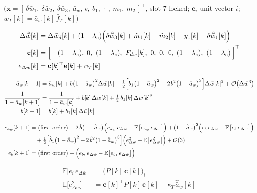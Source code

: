 \documentclass[11pt,a4paper,fontset=none]{ctexart}
\newcommand{\ba}{\bar{a}}
\newcommand{\bw}{\bar{w}}
\newcommand{\dW}{\Delta\bw}
\newcommand{\dWh}{\Delta\hat{\bw}}
\newcommand{\eD}{e_{\Delta\bw}}
\newcommand{\ah}{\hat{\ba}_w}
\newcommand{\bh}{\hat{b}}
\newcommand{\bhh}{\hat{b}_1}
\newcommand{\ea}{e_{\ba_w}}
\newcommand{\E}{\mathbb{E}}
\begin{document}
$\bigl(\mathbf{x} = [\,\delta\bw_1,\ \delta\bw_2,\ \delta\bw_3,\ \ba_w,\ b,\ b_1,\ \cdot\,,\ m_1,\ m_2\,]^{\top}$, slot 7 locked;
$\mathbf{e}_i$ unit vector $i$; $w_T[k] = \ba_w[k]\,\bar f_T[k]\bigr)$

\begin{align*}
\dWh[k] &= \Delta\bw_d[k] + (1-\lambda_c)\Bigl(\delta\hat{\bw}_3[k] + \hat m_1[k] + \hat m_2[k] + y_1[k] - \delta\hat{\bw}_1[k]\Bigr) \\
\mathbf{c}[k] &= \Bigl[\,-(1-\lambda_c),\ 0,\ (1-\lambda_c),\ F_{dw}[k],\ 0,\ 0,\ 0,\ (1-\lambda_c),\ (1-\lambda_c)\,\Bigr]^{\top} \\
\eD[k] &= \mathbf{c}[k]^{\top}\mathbf{e}[k] + w_T[k]
\end{align*}

\begin{align*}
\ba_w[k+1] &= \ba_w[k] + b\bigl(1-\ba_w\bigr)^{2}\dW[k] + \tfrac{1}{2}\Bigl[b_1\bigl(1-\ba_w\bigr)^{2} - 2\,b^{2}\bigl(1-\ba_w\bigr)^{3}\Bigr]\dW[k]^{2} + \mathcal{O}\bigl(\dW^{3}\bigr) \\
\frac{1}{1-\ba_w[k+1]} &= \frac{1}{1-\ba_w[k]} + b[k]\,\dW[k] + \tfrac{1}{2}\,b_1[k]\,\dW[k]^{2} \\
b[k+1] &= b[k] + b_1[k]\,\dW[k]
\end{align*}

\begin{align*}
\ea[k+1] &= \bigl(\text{first order}\bigr) - 2\,\bh\bigl(1-\ah\bigr)\Bigl(\ea\,\eD - \E\bigl[\ea\,\eD\bigr]\Bigr)
            + \bigl(1-\ah\bigr)^{2}\Bigl(e_b\,\eD - \E\bigl[e_b\,\eD\bigr]\Bigr) \\
         &\quad + \tfrac{1}{2}\Bigl[\bhh\bigl(1-\ah\bigr)^{2} - 2\,\bh^{2}\bigl(1-\ah\bigr)^{3}\Bigr]\Bigl(\eD^{2} - \E\bigl[\eD^{2}\bigr]\Bigr) + \mathcal{O}(3) \\
e_b[k+1] &= \bigl(\text{first order}\bigr) + \Bigl(e_{b_1}\,\eD - \E\bigl[e_{b_1}\,\eD\bigr]\Bigr)
\end{align*}

\begin{align*}
\E\bigl[e_i\,\eD\bigr] &= \bigl(P[k]\,\mathbf{c}[k]\bigr)_i \\
\E\bigl[\eD^{2}\bigr]  &= \mathbf{c}[k]^{\top}P[k]\,\mathbf{c}[k] + \kappa_T\,\ah[k]
\end{align*}
\end{document}
